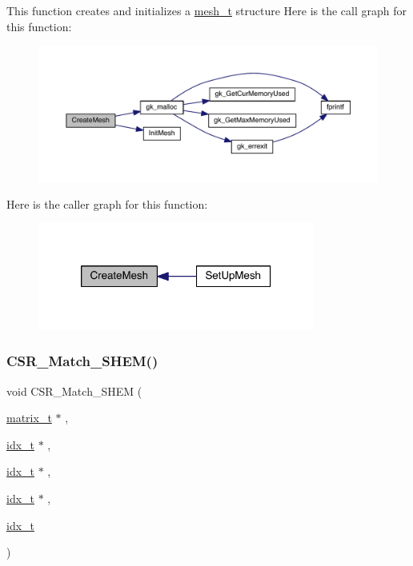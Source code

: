 This function creates and initializes a \hyperlink{a00738}{mesh\+\_\+t} structure Here is the call graph for this function\+:\nopagebreak
\begin{figure}[H]
\begin{center}
\leavevmode
\includegraphics[width=350pt]{a00951_aec1a4bd83e832be7befbf6b03e9513ad_cgraph}
\end{center}
\end{figure}
Here is the caller graph for this function\+:\nopagebreak
\begin{figure}[H]
\begin{center}
\leavevmode
\includegraphics[width=258pt]{a00951_aec1a4bd83e832be7befbf6b03e9513ad_icgraph}
\end{center}
\end{figure}
\mbox{\label{a00951_a2a23c46e95ebf1689ff36360528696ac}} 
\subsubsection{\texorpdfstring{C\+S\+R\+\_\+\+Match\+\_\+\+S\+H\+E\+M()}{CSR\_Match\_SHEM()}}
{\footnotesize\ttfamily void C\+S\+R\+\_\+\+Match\+\_\+\+S\+H\+EM (\begin{DoxyParamCaption}\item[{\hyperlink{a00754}{matrix\+\_\+t} $\ast$}]{,  }\item[{\hyperlink{a00876_aaa5262be3e700770163401acb0150f52}{idx\+\_\+t} $\ast$}]{,  }\item[{\hyperlink{a00876_aaa5262be3e700770163401acb0150f52}{idx\+\_\+t} $\ast$}]{,  }\item[{\hyperlink{a00876_aaa5262be3e700770163401acb0150f52}{idx\+\_\+t} $\ast$}]{,  }\item[{\hyperlink{a00876_aaa5262be3e700770163401acb0150f52}{idx\+\_\+t}}]{ }\end{DoxyParamCaption})}

